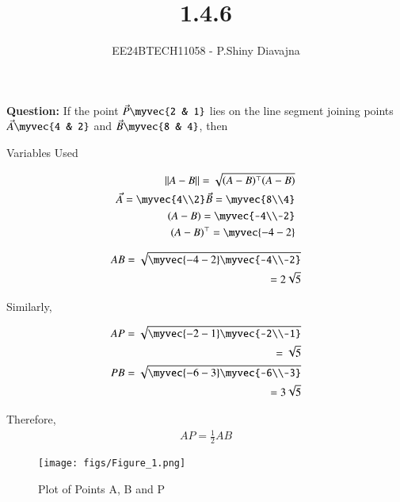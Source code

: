 \documentclass[journal]{IEEEtran}
\begin{document}

\vspace{3cm}

\title{1.4.6}
\author{EE24BTECH11058 - P.Shiny Diavajna}
{\let\newpage\relax\maketitle}

\renewcommand{\thefigure}{\theenumi}
\renewcommand{\thetable}{\theenumi}
\setlength{\intextsep}{10pt} %


\renewcommand{\thetable}{\theenumi}

\textbf{Question:} If the point $\vec{P}\myvec{2 & 1}$ lies on the line segment joining points $\vec{A}\myvec{4 & 2}$ and $\vec{B}\myvec{8 & 4}$, then \\

   \solution
   \begin{table}[h!]    
     \centering
     
     \caption{Variables Used}
     \label{tab1.4.6.1}
   \end{table}


   \begin{align*}
      ||A-B||=\sqrt{(A-B)^\top(A-B)}\\
      \vec{A}=\myvec{4\\2}   \vec{B}=\myvec{8\\4}\\
      (A-B)=\myvec{-4\\-2}\\
      (A-B)^\top=\myvec{-4 -2}\\
   \end{align*}

   \begin{align*}
      AB=\sqrt{\myvec{-4 -2} \myvec{-4\\-2}} \\=2\sqrt{5}\\
   \end{align*}
   
   Similarly,

   \begin{align*}
      AP=\sqrt{\myvec{-2 -1} \myvec{-2\\-1}}\\=\sqrt{5}\\
      PB=\sqrt{\myvec{-6 -3} \myvec{-6\\-3}}\\=3\sqrt{5}\\
   \end{align*}

 Therefore,
   \begin{align*}
     AP=\frac{1}{2}AB
   \end{align*}

  \begin{figure}[h]
    \centering
    \texttt{[image: figs/Figure\_1.png]}
    \caption{Plot of Points A, B and P}
 \end{figure}
\end{document}
